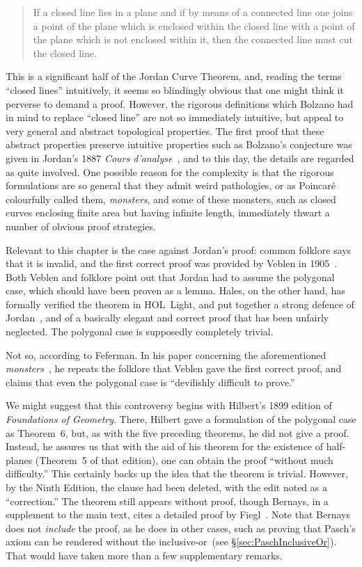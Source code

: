 \begin{quote}
If a closed line lies in a plane and if by means of a connected line one joins a point of the plane which is enclosed within the closed line with a point of the plane which is not enclosed within it, then the connected line must cut the closed line.
\end{quote}

This is a significant half of the Jordan Curve Theorem, and, reading the terms ``closed lines'' intuitively, it seems so blindingly obvious that one might think it perverse to demand a proof. However, the rigorous definitions which Bolzano had in mind to replace ``closed line'' are not so immediately intuitive, but appeal to very general and abstract topological properties. The first proof that these abstract properties preserve intuitive properties such as Bolzano's conjecture was given in Jordan's 1887 \emph{Cours d'analyse}~\cite{JordanTextBook}, and to this day, the details are regarded as quite involved. One possible reason for the complexity is that the rigorous formulations are so general that they admit weird pathologies, or as Poincar\'{e} colourfully called them, \emph{monsters}, and some of these monsters, such as closed curves enclosing finite area but having infinite length, immediately thwart a number of obvious proof strategies.

Relevant to this chapter is the case against Jordan's proof: common folklore says that it is invalid, and the first correct proof was provided by Veblen in 1905~\cite{VeblenJordan}. Both Veblen and folklore point out that Jordan had to assume the polygonal case, which should have been proven as a lemma. Hales, on the other hand, has formally verified the theorem in HOL~Light, and put together a strong defence of Jordan~\cite{HalesJordansProof}, and of a basically elegant and correct proof that has been unfairly neglected. The polygonal case is supposedly completely trivial. 

Not so, according to Feferman. In his paper concerning the aforementioned \emph{monsters}~\cite{IntuitionMonsters}, he repeats the folklore that Veblen gave the first correct proof, and claims that even the polygonal case is ``devilishly difficult to prove.''

We might suggest that this controversy begins with Hilbert's 1899 edition of \emph{Foundations of Geometry}. There, Hilbert gave a formulation of the polygonal case as Theorem~6, but, as with the five preceding theorems, he did not give a proof. Instead, he assures us that with the aid of his theorem for the existence of half-planes (Theorem~5 of that edition), one can obtain the proof ``without much difficulty.'' This certainly backs up the idea that the theorem is trivial. However, by the Ninth Edition, the clause had been deleted, with the edit noted as a ``correction.'' The theorem still appears without proof, though Bernays, in a supplement to the main text, cites a detailed proof by Fiegl~\cite{FeiglJordan}. Note that Bernays does not \emph{include} the proof, as he does in other cases, such as proving that Pasch's axiom can be rendered without the inclusive-or~(see \S\ref{sec:PaschInclusiveOr}). That would have taken more than a few supplementary remarks.

